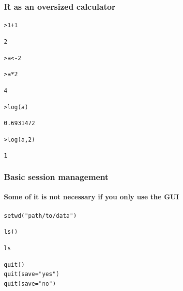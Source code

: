 \documentclass[t]{beamer} %
\begin{document}
\begin{frame}[fragile]
  \frametitle{R as an oversized calculator}
  
\begin{alltt}
> 1+1  \begin{Rout}
[1] 2
\end{Rout}
> a <- 2     

> a * 2  \begin{Rout}
[1] 4
\end{Rout}
> log(a)     \begin{Rout}
[1] 0.6931472
\end{Rout}
> log(a,2)   \begin{Rout}
[1] 1
\end{Rout}
\end{alltt}

\end{frame}



\begin{frame}[fragile]
  \frametitle{Basic session management}
  \framesubtitle{Some of it is not necessary if you only use the GUI}

\ungap[1]
\begin{alltt}

setwd("path/to/data")  

ls()                   

ls                     

quit()                 
quit(save="yes")
quit(save="no")

\end{alltt}

\end{frame}
\end{document}
